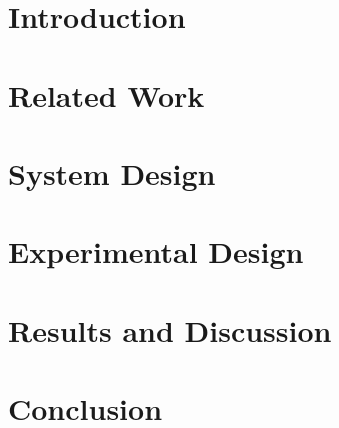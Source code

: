 \chapter{Introduction}
\label{intro}


\chapter{Related Work}
\label{relatedwork}


\chapter{System Design}
\label{system-design}


\chapter{Experimental Design}
\label{experimental}


\chapter{Results and Discussion}
\label{results}


\chapter{Conclusion}
\label{conclusion}


